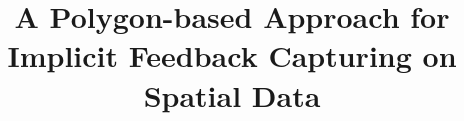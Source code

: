 \documentclass{vldb}
\begin{document}

\title{A Polygon-based Approach for Implicit Feedback Capturing on Spatial Data}




%
%
%
%

\end{document}
